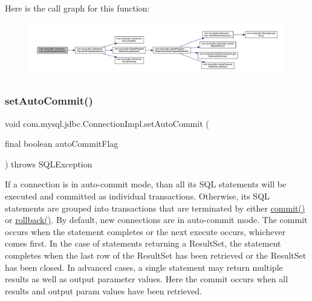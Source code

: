 Here is the call graph for this function\+:\nopagebreak
\begin{figure}[H]
\begin{center}
\leavevmode
\includegraphics[width=350pt]{classcom_1_1mysql_1_1jdbc_1_1_connection_impl_a8bfab236948ec5c7432306cf7eebfd12_cgraph}
\end{center}
\end{figure}
\mbox{\label{classcom_1_1mysql_1_1jdbc_1_1_connection_impl_aa5a8a261dfc670c3426f7949a56056ca}} 
\subsubsection{\texorpdfstring{set\+Auto\+Commit()}{setAutoCommit()}}
{\footnotesize\ttfamily void com.\+mysql.\+jdbc.\+Connection\+Impl.\+set\+Auto\+Commit (\begin{DoxyParamCaption}\item[{final boolean}]{auto\+Commit\+Flag }\end{DoxyParamCaption}) throws S\+Q\+L\+Exception}

If a connection is in auto-\/commit mode, than all its S\+QL statements will be executed and committed as individual transactions. Otherwise, its S\+QL statements are grouped into transactions that are terminated by either \mbox{\hyperlink{classcom_1_1mysql_1_1jdbc_1_1_connection_impl_aa2c8c829d30458f22f7785396eb18af1}{commit()}} or \mbox{\hyperlink{classcom_1_1mysql_1_1jdbc_1_1_connection_impl_a62b6461dc72ef3c739da196995cb9786}{rollback()}}. By default, new connections are in auto-\/commit mode. The commit occurs when the statement completes or the next execute occurs, whichever comes first. In the case of statements returning a Result\+Set, the statement completes when the last row of the Result\+Set has been retrieved or the Result\+Set has been closed. In advanced cases, a single statement may return multiple results as well as output parameter values. Here the commit occurs when all results and output param values have been retrieved.


